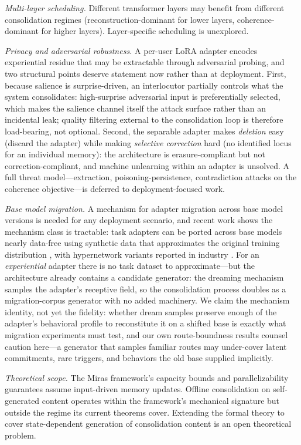 \documentclass[11pt]{article}
\begin{document}
\textit{Multi-layer scheduling.} Different transformer layers may benefit from different consolidation regimes (reconstruction-dominant for lower layers, coherence-dominant for higher layers). Layer-specific scheduling is unexplored.

\textit{Privacy and adversarial robustness.} A per-user LoRA adapter encodes experiential residue that may be extractable through adversarial probing, and two structural points deserve statement now rather than at deployment. First, because salience is surprise-driven, an interlocutor partially controls what the system consolidates: high-surprise adversarial input is preferentially selected, which makes the salience channel itself the attack surface rather than an incidental leak; quality filtering external to the consolidation loop is therefore load-bearing, not optional. Second, the separable adapter makes \emph{deletion} easy (discard the adapter) while making \emph{selective correction} hard (no identified locus for an individual memory): the architecture is erasure-compliant but not correction-compliant, and machine unlearning within an adapter is unsolved. A full threat model---extraction, poisoning-persistence, contradiction attacks on the coherence objective---is deferred to deployment-focused work.

\textit{Base model migration.} A mechanism for adapter migration across base model versions is needed for any deployment scenario, and recent work shows the mechanism class is tractable: task adapters can be ported across base models nearly data-free using synthetic data that approximates the original training distribution \cite{translora2024}, with hypernetwork variants reported in industry \cite{portal2026}. For an \emph{experiential} adapter there is no task dataset to approximate---but the architecture already contains a candidate generator: the dreaming mechanism samples the adapter's receptive field, so the consolidation process doubles as a migration-corpus generator with no added machinery. We claim the mechanism identity, not yet the fidelity: whether dream samples preserve enough of the adapter's behavioral profile to reconstitute it on a shifted base is exactly what migration experiments must test, and our own route-boundness results counsel caution here---a generator that samples familiar routes may under-cover latent commitments, rare triggers, and behaviors the old base supplied implicitly.

\textit{Theoretical scope.} The Miras framework's capacity bounds and parallelizability guarantees assume input-driven memory updates. Offline consolidation on self-generated content operates within the framework's mechanical signature but outside the regime its current theorems cover. Extending the formal theory to cover state-dependent generation of consolidation content is an open theoretical problem.
\end{document}
